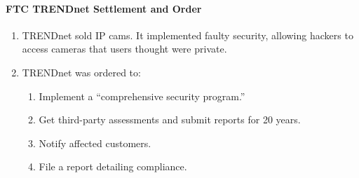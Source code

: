 \paragraph{FTC TRENDnet Settlement and Order}

\begin{enumerate}
    \item TRENDnet sold IP cams. It implemented faulty security, allowing 
    hackers to access cameras that users thought were private.
    \item TRENDnet was ordered to:
    \begin{enumerate}
        \item Implement a ``comprehensive security program.''
        \item Get third-party assessments and submit reports for 20 years.
        \item Notify affected customers.
        \item File a report detailing compliance.
    \end{enumerate}
\end{enumerate}


